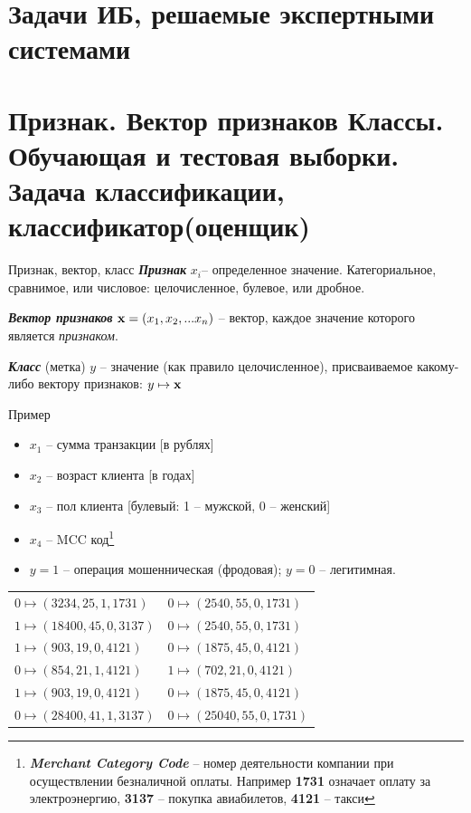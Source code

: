 \documentclass{beamer}
\newcommand{\termdef}[1]{\textbf{\textit{#1}}}
\newcommand{\term}{\textit}
\newcommand{\auditorium}[1]{\color{red}{\textbf{#1}}}
\begin{document}
  
  \section{Задачи ИБ, решаемые экспертными системами}\label{section:is_tasks}

  
    
  \section{Признак. Вектор признаков Классы. Обучающая и тестовая выборки. Задача классификации, классификатор(оценщик)}\label{section:classification_defs}
  
  \begin{frame}{Признак, вектор, класс}
    \termdef{Признак} $x_i$-- определенное значение. Категориальное, сравнимое, или числовое: целочисленное, булевое, или дробное.
    
    \termdef{Вектор признаков} $\bold x = (x_1, x_2, ... x_n)$ -- вектор, каждое значение которого является \term{признаком}. 
  	
  	\termdef{Класс} (метка) $y$ -- значение (как правило целочисленное), присваиваемое какому-либо вектору признаков: $ y \mapsto \bold x$
  	
  	\auditorium{А в чем физический смысл?}
  \end{frame}
  
  \begin{frame}{Пример}\label{frame:class_feature_vector_example}
  \begin{itemize}
  	 \item $x_1$ -- сумма транзакции [в рублях]
  	 \item $x_2$ -- возраст клиента [в годах]
  	 \item $x_3$ -- пол клиента [булевый: 1 -- мужской, 0 -- женский]
  	 \item $x_4$ -- MCC код\footnote{\termdef{Merchant Category Code} -- номер деятельности компании при осуществлении безналичной оплаты. Например \textbf{1731} означает оплату за электроэнергию, \textbf{3137} -- покупка авиабилетов, \textbf{4121} -- такси}
  	 \item  $y=1$ -- операция мошенническая (фродовая);  $y=0$ -- легитимная.
  \end{itemize}
  \begin{center}\small \begin{tabular}{ l l }
  	$0 \mapsto (3234, 25, 1, 1731) $ &  $0 \mapsto (2540, 55, 0, 1731)$ \\
  	$1 \mapsto (18400, 45, 0, 3137)$ & $0 \mapsto (2540, 55, 0, 1731)$  \\
  	$1 \mapsto (903, 19, 0, 4121)$  & $0 \mapsto (1875, 45, 0, 4121)$  \\
  	$0 \mapsto (854, 21, 1, 4121)$  & $1 \mapsto (702, 21, 0, 4121)$  \\
  	$1 \mapsto (903, 19, 0, 4121)$  & $0 \mapsto (1875, 45, 0, 4121)$  \\
  	$0 \mapsto (28400, 41, 1, 3137)$ & $0 \mapsto (25040, 55, 0, 1731)$  \\
  \end{tabular}\end{center}
  \end{frame}
  
\end{document}
